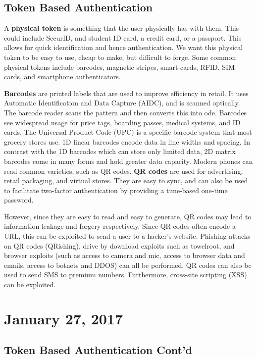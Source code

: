\documentclass[11pt]{article}
\theoremstyle{plain} %
\theoremstyle{definition}
\theoremstyle{example}
\theoremstyle{remark}
\begin{document}
\subsection{Token Based Authentication}

A \textbf{physical token} is something that the user physically has with them. This could include SecurID, and student ID card, a credit card, or a passport. This allows for quick identification and hence authentication. We want this physical token to be easy to use, cheap to make, but difficult to forge. Some common physical tokens include barcodes, magnetic stripes, smart cards, RFID, SIM cards, and smartphone authenticators. 

\textbf{Barcodes} are printed labels that are used to improve efficiency in retail. It uses Automatic Identification and Data Capture (AIDC), and is scanned optically. The barcode reader scans the pattern and then converts this into ode. Barcodes see widespread usage for price tags, boarding passes, medical systems, and ID cards. The Universal Product Code (UPC) is a specific barcode system that most grocery stores use. 1D linear barcodes encode data in line widths and spacing. In contrast with the 1D barcodes which can store only limited data, 2D matrix barcodes come in many forms and hold greater data capacity. Modern phones can read common varieties, such as QR codes. \textbf{QR codes} are used for advertising, retail packaging, and virtual stores. They are easy to sync, and can also be used to facilitate two-factor authentication by providing a time-based one-time password. 

However, since they are easy to read and easy to generate, QR codes may lead to information leakage and forgery respectively. Since QR codes often encode a URL, this can be exploited to send a user to a hacker's website. Phishing attacks on QR codes (QRishing), drive by download exploits such as towelroot, and browser exploits (such as access to camera and mic, access to browser data and emails, access to botnets and DDOS) can all be performed. QR codes can also be used to send SMS to premium numbers. Furthermore, cross-site scripting (XSS) can be exploited. 

\section{January 27, 2017}
\subsection{Token Based Authentication Cont'd}
\end{document}
